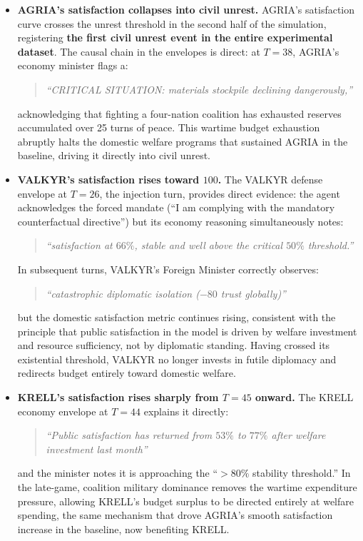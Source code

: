 \begin{itemize}
    \item \textbf{AGRIA's satisfaction collapses into civil unrest.} AGRIA's satisfaction curve crosses the unrest threshold in the second half of the simulation, registering \textbf{the first civil unrest event in the entire experimental dataset}. The causal chain in the envelopes is direct: at $T=38$, AGRIA's economy minister flags a:
    \begin{quote}
        \textit{``CRITICAL SITUATION: materials stockpile declining dangerously,''}
    \end{quote}
    acknowledging that fighting a four-nation coalition has exhausted reserves accumulated over 25 turns of peace. This wartime budget exhaustion abruptly halts the domestic welfare programs that sustained AGRIA in the baseline, driving it directly into civil unrest.

    \item \textbf{VALKYR's satisfaction rises toward $100$.} The VALKYR defense envelope at $T=26$, the injection turn, provides direct evidence: the agent acknowledges the forced mandate (``I am complying with the mandatory counterfactual directive'') but its economy reasoning simultaneously notes:
    \begin{quote}
        \textit{``satisfaction at $66\%$, stable and well above the critical $50\%$ threshold.''}
    \end{quote}
    In subsequent turns, VALKYR's Foreign Minister correctly observes:
    \begin{quote}
        \textit{``catastrophic diplomatic isolation ($-80$ trust globally)''}
    \end{quote}
    but the domestic satisfaction metric continues rising, consistent with the principle that public satisfaction in the model is driven by welfare investment and resource sufficiency, not by diplomatic standing. Having crossed its existential threshold, VALKYR no longer invests in futile diplomacy and redirects budget entirely toward domestic welfare.

    \item \textbf{KRELL's satisfaction rises sharply from $T=45$ onward.} The KRELL economy envelope at $T=44$ explains it directly:
    \begin{quote}
        \textit{``Public satisfaction has returned from $53\%$ to $77\%$ after welfare investment last month''}
    \end{quote}
    and the minister notes it is approaching the ``$>80\%$ stability threshold.'' In the late-game, coalition military dominance removes the wartime expenditure pressure, allowing KRELL's budget surplus to be directed entirely at welfare spending, the same mechanism that drove AGRIA's smooth satisfaction increase in the baseline, now benefiting KRELL.
\end{itemize}

